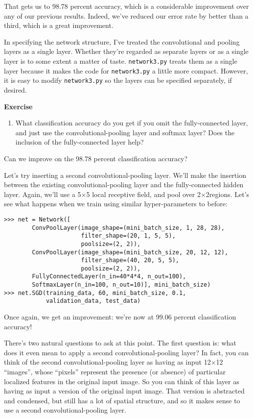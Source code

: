 That gets us to 98.78 percent accuracy, which is a considerable improvement over any of our previous results. Indeed, we've reduced our error rate by better than a third, which is a great improvement.

In specifying the network structure, I've treated the convolutional and pooling layers as a single layer. Whether they're regarded as separate layers or as a single layer is to some extent a matter of taste. \lstinline{network3.py} treats them as a single layer because it makes the code for \lstinline{network3.py} a little more compact. However, it is easy to modify \lstinline{network3.py} so the layers can be specified separately, if desired.

\textbf{Exercise}

\begin{enumerate}
\item What classification accuracy do you get if you omit the fully-connected layer, and just use the convolutional-pooling layer and softmax layer? Does the inclusion of the fully-connected layer help? 
\end{enumerate}

Can we improve on the 98.78 percent classification accuracy?

Let's try inserting a second convolutional-pooling layer. We'll make the insertion between the existing convolutional-pooling layer and the fully-connected hidden layer. Again, we'll use a 5$\times$5 local receptive field, and pool over 2$\times$2regions. Let's see what happens when we train using similar hyper-parameters to before:

\begin{lstlisting}
>>> net = Network([
        ConvPoolLayer(image_shape=(mini_batch_size, 1, 28, 28), 
                      filter_shape=(20, 1, 5, 5), 
                      poolsize=(2, 2)),
        ConvPoolLayer(image_shape=(mini_batch_size, 20, 12, 12), 
                      filter_shape=(40, 20, 5, 5), 
                      poolsize=(2, 2)),
        FullyConnectedLayer(n_in=40*4*4, n_out=100),
        SoftmaxLayer(n_in=100, n_out=10)], mini_batch_size)
>>> net.SGD(training_data, 60, mini_batch_size, 0.1, 
            validation_data, test_data) 
\end{lstlisting}

 Once again, we get an improvement: we're now at 99.06 percent classification accuracy!

There's two natural questions to ask at this point. The first question is: what does it even mean to apply a second convolutional-pooling layer? In fact, you can think of the second convolutional-pooling layer as having as input 12$\times$12 ``images'', whose ``pixels'' represent the presence (or absence) of particular localized features in the original input image. So you can think of this layer as having as input a version of the original input image. That version is abstracted and condensed, but still has a lot of spatial structure, and so it makes sense to use a second convolutional-pooling layer.

